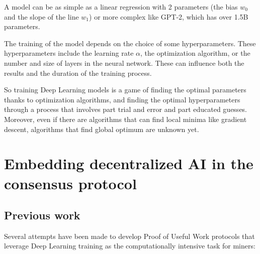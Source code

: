 \documentclass[conference]{IEEEtran}
\begin{document}
A model can be as simple as a linear regression with 2 parameters (the bias $w_0$ and the slope of the line $w_1$) or more complex like GPT-2, which has over 1.5B parameters\cite{b5}.

The training of the model depends on the choice of some hyperparameters. These hyperparameters include the learning rate $\alpha$, the optimization algorithm, or the number and size of layers in the neural network. These can influence both the results and the duration of the training process.

So training Deep Learning models is a game of finding the optimal parameters thanks to optimization algorithms, and finding the optimal hyperparameters through a process that involves part trial and error and part educated guesses. Moreover, even if there are algorithms that can find local minima like gradient descent, algorithms that find global optimum are unknown yet.

\section{Embedding decentralized AI in the consensus protocol}
\subsection{Previous work}
Several attempts have been made to develop Proof of Useful Work protocols that leverage Deep Learning training as the computationally intensive task for miners:
\end{document}
